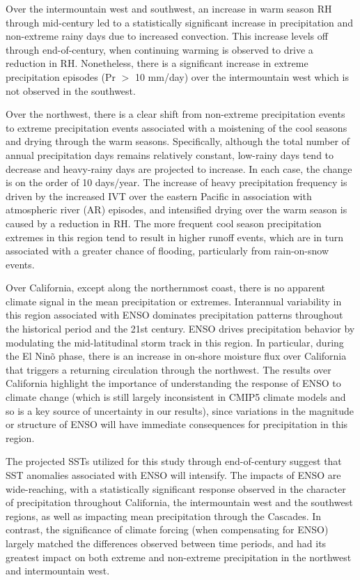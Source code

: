 \documentclass{ametsoc}
\begin{document}
Over the intermountain west and southwest, an increase in warm season RH through mid-century led to a statistically significant increase in precipitation and non-extreme rainy days due to increased convection. This increase levels off through end-of-century, when continuing warming is observed to drive a reduction in RH.  Nonetheless, there is a significant increase in extreme precipitation episodes (Pr $>$ 10 mm/day) over the intermountain west which is not observed in the southwest.

Over the northwest, there is a clear shift from non-extreme precipitation events to extreme precipitation events associated with a moistening of the cool seasons and drying through the warm seasons.  Specifically, although the total number of annual precipitation days remains relatively constant, low-rainy days tend to decrease and heavy-rainy days are projected to increase.  In each case, the change is on the order of 10 days/year. The increase of heavy precipitation frequency is driven by the increased IVT over the eastern Pacific in association with atmospheric river (AR) episodes, and intensified drying over the warm season is caused by a reduction in RH. The more frequent cool season precipitation extremes in this region tend to result in higher runoff events, which are in turn associated with a greater chance of flooding, particularly from rain-on-snow events.

Over California, except along the northernmost coast, there is no apparent climate signal in the mean precipitation or extremes. Interannual variability in this region associated with ENSO dominates precipitation patterns throughout the historical period and the 21st century. ENSO drives precipitation behavior by modulating the mid-latitudinal storm track in this region.  In particular, during the El Nin\~o phase, there is an increase in on-shore moisture flux over California that triggers a returning circulation through the northwest.  The results over California highlight the importance of understanding the response of ENSO to climate change (which is still largely inconsistent in CMIP5 climate models and so is a key source of uncertainty in our results), since variations in the magnitude or structure of ENSO will have immediate consequences for precipitation in this region.

The projected SSTs utilized for this study through end-of-century suggest that SST anomalies associated with ENSO will intensify. The impacts of ENSO are wide-reaching, with a statistically significant response observed in the character of precipitation throughout California, the intermountain west and the southwest regions, as well as impacting mean precipitation through the Cascades.  In contrast, the significance of climate forcing (when compensating for ENSO) largely matched the differences observed between time periods, and had its greatest impact on both extreme and non-extreme precipitation in the northwest and intermountain west.
\end{document}
